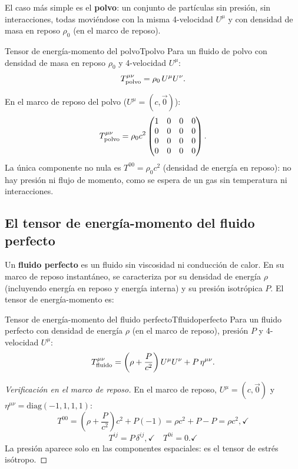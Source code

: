 El caso más simple es el \textbf{polvo}: un conjunto de partículas sin presión, sin interacciones, todas moviéndose con la misma 4-velocidad $U^\mu$ y con densidad de masa en reposo $\rho_0$ (en el marco de reposo).

\begin{definicion}{Tensor de energía-momento del polvo}{Tpolvo}
Para un fluido de polvo con densidad de masa en reposo $\rho_0$ y 4-velocidad $U^\mu$:
\begin{equation}
  T^{\mu\nu}_{\rm polvo} = \rho_0\,U^\mu U^\nu.
  \label{eq:Tpolvo}
\end{equation}
\end{definicion}

En el marco de reposo del polvo ($U^\mu = (c, \vec{0})$):
\[
  T^{\mu\nu}_{\rm polvo} = \rho_0 c^2
  \begin{pmatrix}
    1 & 0 & 0 & 0 \\
    0 & 0 & 0 & 0 \\
    0 & 0 & 0 & 0 \\
    0 & 0 & 0 & 0
  \end{pmatrix}.
\]
La única componente no nula es $T^{00} = \rho_0 c^2$ (densidad de energía en reposo): no hay presión ni flujo de momento, como se espera de un gas sin temperatura ni interacciones.

\subsection{El tensor de energía-momento del fluido perfecto}

Un \textbf{fluido perfecto} es un fluido sin viscosidad ni conducción de calor. En su marco de reposo instantáneo, se caracteriza por su densidad de energía $\rho$ (incluyendo energía en reposo y energía interna) y su presión isotrópica $P$. El tensor de energía-momento es:

\begin{definicion}{Tensor de energía-momento del fluido perfecto}{Tfluidoperfecto}
Para un fluido perfecto con densidad de energía $\rho$ (en el marco de reposo), presión $P$ y 4-velocidad $U^\mu$:
\begin{equation}
  T^{\mu\nu}_{\rm fluido} = \left(\rho + \frac{P}{c^2}\right)U^\mu U^\nu + P\,\eta^{\mu\nu}.
  \label{eq:Tfluido}
\end{equation}
\end{definicion}

\begin{proof}[Verificación en el marco de reposo]
En el marco de reposo, $U^\mu = (c, \vec{0})$ y $\eta^{\mu\nu} = \mathrm{diag}(-1,1,1,1)$:
\[
  T^{00} = \left(\rho + \frac{P}{c^2}\right)c^2 + P(-1) = \rho c^2 + P - P = \rho c^2, \checkmark
\]
\[
  T^{ij} = P\,\delta^{ij}, \checkmark \quad T^{0i} = 0. \checkmark
\]
La presión aparece solo en las componentes espaciales: es el tensor de estrés isótropo.
\end{proof}

